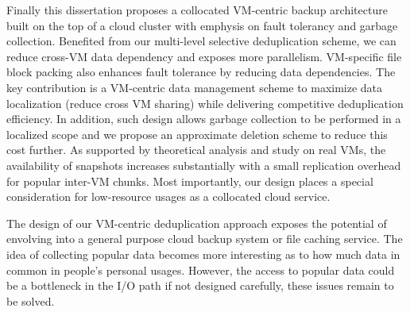 Finally this dissertation proposes a collocated VM-centric backup architecture
built on the top of a cloud cluster with emphysis on fault tolerancy and garbage collection. 
Benefited from our multi-level selective deduplication scheme, 
we can reduce cross-VM data dependency and exposes more parallelism. 
VM-specific file
block packing also enhances fault tolerance by reducing
data dependencies.
The key contribution is a VM-centric data management scheme 
to maximize data localization (reduce cross VM sharing) while delivering 
competitive deduplication efficiency. In addition,
such design allows garbage collection to be performed in a 
localized scope and we propose an approximate deletion
scheme to reduce this cost further.
As supported by theoretical analysis and study on real VMs, 
the availability of snapshots increases substantially with a small
replication overhead for popular inter-VM chunks.
Most importantly, our design places a special consideration for 
low-resource usages as a collocated cloud service. 

The design of our VM-centric deduplication approach exposes the potential of
envolving into a general purpose cloud backup system or file caching service. The idea of collecting
popular data becomes more interesting as to how much data in common in people's personal usages.
However, the access to popular data could be a bottleneck in the I/O path if not designed carefully,
these issues remain to be solved.

